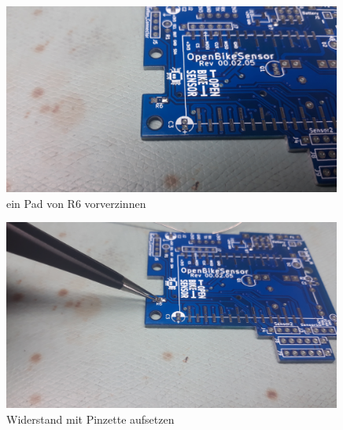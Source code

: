 \documentclass[12pt, a4paper]{article}		%
\begin{document}
\begin{minipage}[t]{0.49\textwidth}
\begin{figure}[H]
	\centering
		\includegraphics[width=0.99\textwidth]{Grafiken/20200922_185326.jpg}
	\caption{ein Pad von R6 vorverzinnen}
	\label{fig:20200922_185326}
\end{figure}
\end{minipage}
\begin{minipage}[t]{0.49\textwidth}
\begin{figure}[H]
	\centering
		\includegraphics[width=0.99\textwidth]{Grafiken/20200922_185414.jpg}
	\caption{Widerstand mit Pinzette aufsetzen}
	\label{fig:20200922_185414}
\end{figure}
\end{minipage}
\end{document}
